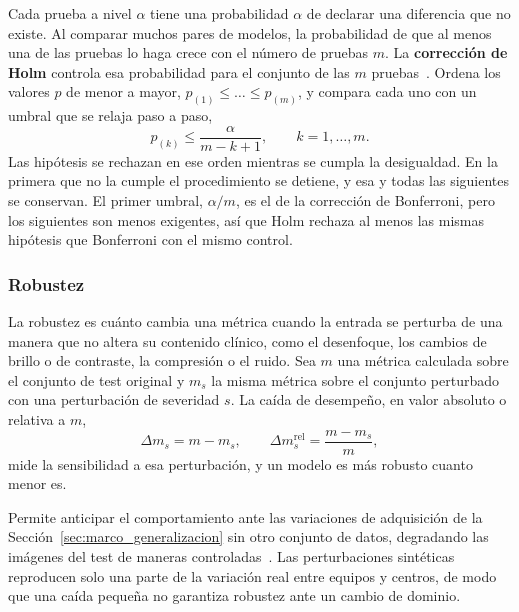 \begingroup Cada prueba a nivel $\alpha$ tiene una probabilidad $\alpha$ de declarar una diferencia que no existe. Al
comparar muchos pares de modelos, la probabilidad de que al menos una de las pruebas lo haga crece con el número de
pruebas $m$. La \textbf{corrección de Holm} controla esa probabilidad para el conjunto de las $m$
pruebas~\cite{holm1979simple}. Ordena los valores $p$ de menor a mayor, $p_{(1)} \le \dots \le p_{(m)}$, y compara cada
uno con un umbral que se relaja paso a paso,
\begin{equation}
    p_{(k)} \le \frac{\alpha}{m - k + 1}, \qquad k = 1, \dots, m.
    \label{eq:marco_holm}
\end{equation}
Las hipótesis se rechazan en ese orden mientras se cumpla la desigualdad. En la primera que no la cumple el
procedimiento se detiene, y esa y todas las siguientes se conservan. El primer umbral, $\alpha/m$, es el de la
corrección de Bonferroni, pero los siguientes son menos exigentes, así que Holm rechaza al menos las mismas hipótesis
que Bonferroni con el mismo control.\par\endgroup

\subsubsection{Robustez}
\label{sec:marco_eval_robustez}

\begingroup La robustez es cuánto cambia una métrica cuando la entrada se perturba de una manera que no altera su
contenido clínico, como el desenfoque, los cambios de brillo o de contraste, la compresión o el ruido. Sea $m$
una métrica calculada sobre el conjunto de test original y $m_s$ la misma métrica sobre el conjunto perturbado
con una perturbación de severidad $s$. La caída de desempeño, en valor absoluto o relativa a $m$,
\begin{equation}
    \Delta m_s = m - m_s, \qquad
    \Delta m_s^{\text{rel}} = \frac{m - m_s}{m},
    \label{eq:marco_robustez}
\end{equation}
mide la sensibilidad a esa perturbación, y un modelo es más robusto cuanto menor es.\par\endgroup

Permite anticipar el comportamiento ante las variaciones de adquisición de la
Sección~\ref{sec:marco_generalizacion} sin otro conjunto de datos, degradando las imágenes del test de
maneras controladas~\cite{hendrycks2019benchmarking}. Las perturbaciones sintéticas reproducen solo una parte
de la variación real entre equipos y centros, de modo que una caída pequeña no garantiza robustez ante un
cambio de dominio.

